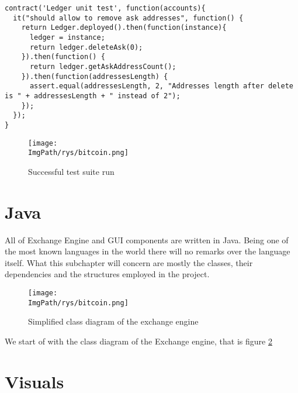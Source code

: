 \documentclass[a4paper,12pt,twoside,openany]{report}
\newcommand{\ImgPath}{.}
\begin{document}
\begin{lstlisting}
contract('Ledger unit test', function(accounts){
  it("should allow to remove ask addresses", function() {
    return Ledger.deployed().then(function(instance){
      ledger = instance;
      return ledger.deleteAsk(0);
    }).then(function() {
      return ledger.getAskAddressCount();
    }).then(function(addressesLength) {
      assert.equal(addressesLength, 2, "Addresses length after delete is " + addressesLength + " instead of 2");
    });
  });
}
\end{lstlisting}

\begin{figure}[!htbp]
	\begin{center}
\centering
\texttt{[image: \\ImgPath/rys/bitcoin.png]}
\end{center}
	\caption{Successful test suite run}
	\label{tests}
\end{figure}

\newpage

\section{Java}

All of Exchange Engine and GUI components are written in Java. Being one of the most known languages in the world there will no remarks over the language itself. What this subchapter will concern are mostly the classes, their dependencies and the structures employed in the project.

\begin{figure}[!htbp]
	\begin{center}
\centering
\texttt{[image: \\ImgPath/rys/bitcoin.png]}
\end{center}
	\caption{Simplified class diagram of the exchange engine}
	\label{engine class}
\end{figure}

We start of with the class diagram of the Exchange engine, that is figure \ref{engine class}

\section{Visuals}
\end{document}
